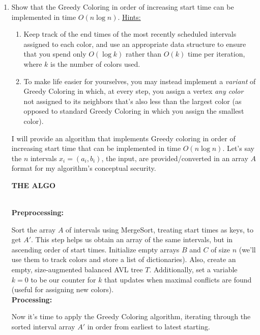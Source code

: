 \documentclass[11pt]{article}
\begin{document}
\begin{enumerate}
\begin{enumerate}
        \item Show that the Greedy Coloring in order of increasing start time can be implemented in time \( O(n\log n) \). \uline{Hints:}
        \begin{enumerate}
            \item Keep track of the end times of the most recently scheduled intervals assigned to each color, and use an appropriate data structure to ensure that you spend only \( O(\log k) \) rather than \( O(k) \) time per iteration, where \( k \) is the number of colors used.
            \item To make life easier for yourselves, you may instead implement a \emph{variant} of Greedy Coloring in which, at every step, you assign a vertex \emph{any color} not assigned to its neighbors that's also less than the largest color (as opposed to standard Greedy Coloring in which you assign the smallest color). \\
        \end{enumerate}
        
        I will provide an algorithm that implements Greedy coloring in order of increasing start time that can be implemented in time $O(n \log n)$. Let's say the $n$ intervals $x_i = (a_i, b_i)$, the input, are provided/converted in an array $A$ format for my algorithm's conceptual security. \\

\begin{center}
    \Large \textbf{THE ALGO}
\end{center} \\

\textbf{Preprocessing:} 

Sort the array $A$ of intervals using MergeSort, treating start times as keys, to get $A'$. This step helps us obtain an array of the same intervals, but in ascending order of start times. Initialize empty arrays $B$ and $C$ of size $n$ (we'll use them to track colors and store a list of dictionaries). Also, create an empty, size-augmented balanced AVL tree $T$. Additionally, set a variable $k = 0$ to be our counter for $k$ that updates when maximal conflicts are found (useful for assigning new colors). \\

\textbf{Processing:} 

Now it's time to apply the Greedy Coloring algorithm, iterating through the sorted interval array $A'$ in order from earliest to latest starting. 


\end{enumerate}
\end{enumerate}
\end{document}
